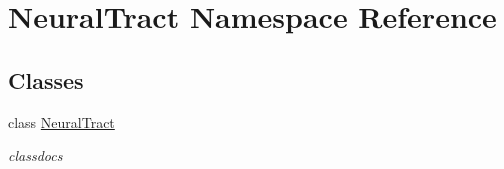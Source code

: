 \hypertarget{namespace_neural_tract}{}\section{Neural\+Tract Namespace Reference}
\label{namespace_neural_tract}
\subsection*{Classes}
\begin{DoxyCompactItemize}
\item 
class \hyperlink{class_neural_tract_1_1_neural_tract}{Neural\+Tract}
\begin{DoxyCompactList}\small\item\em classdocs \end{DoxyCompactList}\end{DoxyCompactItemize}

